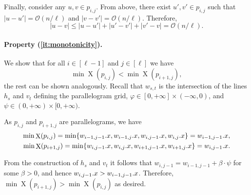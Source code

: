 \documentclass[11pt, letterpaper]{article}
\theoremstyle{plain}
\theoremstyle{definition}
\theoremstyle{remark}
\renewcommand{\O}{\mathcal{O}}
\renewcommand{\phi}{\varphi}
\DeclareMathOperator*{\X}{X}
\begin{document}
Finally, consider any $u, v \in p_{i, j}$. From above, there exist $u', v' \in p_{i, j}$ such that $|u - u'| = \O(n / \ell)$ and $|v - v'| = \O(n / \ell)$. Therefore, 
\[ |u - v| \le |u - u'| + |u' - v'| + |v' - v| = \O(n / \ell). \]

\paragraph*{Property (\ref{it:monotonicity}).} 
We show that for all $i \in [\ell - 1]$ and $j \in [\ell]$ we have
$$\min \X(p_{i, j}) < \min \X(p_{i + 1, j}),$$
the rest can be shown analogously. Recall that $w_{s,t}$ is the intersection of the lines $h_s$ and $v_t$ defining the parallelogram grid, $\phi \in [0, +\infty] \times (-\infty,0)$, and $\psi \in (0,+\infty) \times [0,+\infty)$. 

As $p_{i,j}$ and $p_{i+1,j}$ are parallelograms, we have 
\begin{align*}
\min \X(p_{i, j}) = \min\{\x{w_{i-1,j-1}}, \x{w_{i-1,j}}, \x{w_{i,j-1}},\x{w_{i,j}}\} = \x{w_{i-1,j-1}},\\ 
\min \X(p_{i+1, j}) = \min\{\x{w_{i,j-1}}, \x{w_{i,j}}, \x{w_{i+1,j-1}},\x{w_{i+1,j}}\} = \x{w_{i,j-1}}.
\end{align*}

From the construction of $h_s$ and $v_t$ it follows that $w_{i,j-1} = w_{i-1,j-1} + \beta \cdot \psi$ for some $\beta > 0$, and hence $w_{i,j-1}.x > w_{i-1,j-1}.x$. Therefore, $\min \X(p_{i+1, j}) > \min \X(p_{i, j})$ as desired. 
\end{document}
